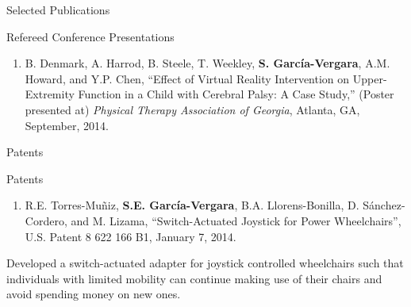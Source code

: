 \documentclass{resume} %
\newcommand{\sectionspace}{\vspace{3mm}}
\newcommand{\Sergio}{\textbf{S. Garc\'{i}a-Vergara}}
\begin{document}
\begin{rSection}{Selected Publications}
\begin{rSubsection}{Refereed Conference Presentations}{}{}{}
\begin{enumerate}
\item B. Denmark, A. Harrod, B. Steele, T. Weekley, \Sergio, A.M. Howard, and
  Y.P. Chen, ``Effect of Virtual Reality Intervention on Upper-Extremity
  Function in a Child with Cerebral Palsy: A Case Study,'' (Poster presented at)
  \textit{Physical Therapy Association of Georgia}, Atlanta, GA, September,
  2014.

\end{enumerate}
\end{rSubsection}

\fi

\end{rSection}










\sectionspace

\begin{rSection}{Patents}

\begin{rSubsection}{Patents}{}{}{}
\item
\begin{enumerate}
\item R.E. Torres-Mu\~{n}iz, \textbf{S.E. Garc\'{i}a-Vergara},
  B.A. Llorens-Bonilla, D. S\'{a}nchez-Cordero, and M. Lizama, ``Switch-Actuated
  Joystick for Power Wheelchairs'', U.S. Patent 8 622 166 B1, January 7, 2014.
\end{enumerate}

Developed a switch-actuated adapter for joystick controlled wheelchairs such
that individuals with limited mobility can continue making use of their chairs
and avoid spending money on new ones.


\end{rSubsection}
\end{rSection}




\iffalse
\sectionspace
\begin{rSection}{Invited Talks \& Demonstrations}

\begin{enumerate}
\item one
\end{enumerate}


\end{rSection}
\fi
\end{document}
